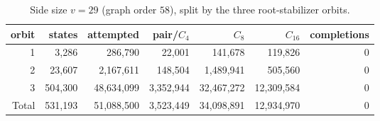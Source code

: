 \begin{table}[ht]
\centering
\caption{Side size $v=29$ (graph order $58$), split by the three root-stabilizer orbits.}
\label{tab:v29-orbits}
\begin{tabular}{rrrrrrr}
\toprule
orbit & states & attempted & pair/$C_4$ & $C_8$ & $C_{16}$ & completions\\
\midrule
1 & 3,286 & 286,790 & 22,001 & 141,678 & 119,826 & 0\\
2 & 23,607 & 2,167,611 & 148,504 & 1,489,941 & 505,560 & 0\\
3 & 504,300 & 48,634,099 & 3,352,944 & 32,467,272 & 12,309,584 & 0\\
\midrule
Total & 531,193 & 51,088,500 & 3,523,449 & 34,098,891 & 12,934,970 & 0\\
\bottomrule
\end{tabular}
\end{table}
